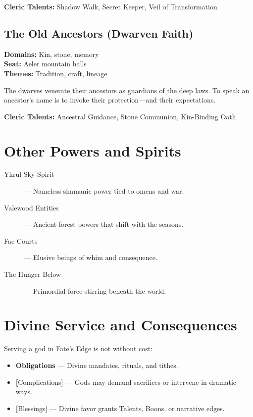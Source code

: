 \textbf{Cleric Talents:} Shadow Walk, Secret Keeper, Veil of Transformation

\subsection*{The Old Ancestors (Dwarven Faith)}

\textbf{Domains:} Kin, stone, memory \\
\textbf{Seat:} Aeler mountain halls \\
\textbf{Themes:} Tradition, craft, lineage

The dwarves venerate their ancestors as guardians of the deep laws. To speak an ancestor's name is to invoke their protection—and their expectations.

\textbf{Cleric Talents:} Ancestral Guidance, Stone Communion, Kin-Binding Oath

\section{Other Powers and Spirits}

\begin{description}
  \item[Ykrul Sky-Spirit] — Nameless shamanic power tied to omens and war.
  \item[Valewood Entities] — Ancient forest powers that shift with the seasons.
  \item[Fae Courts] — Elusive beings of whim and consequence.
  \item[The Hunger Below] — Primordial force stirring beneath the world.
\end{description}

\section{Divine Service and Consequences}

Serving a god in Fate’s Edge is not without cost:

\begin{itemize}
  \item \textbf{Obligations} — Divine mandates, rituals, and tithes.
  \item \textbf[Complications] — Gods may demand sacrifices or intervene in dramatic ways.
  \item \textbf[Blessings] — Divine favor grants Talents, Boons, or narrative edges.
\end{itemize}

